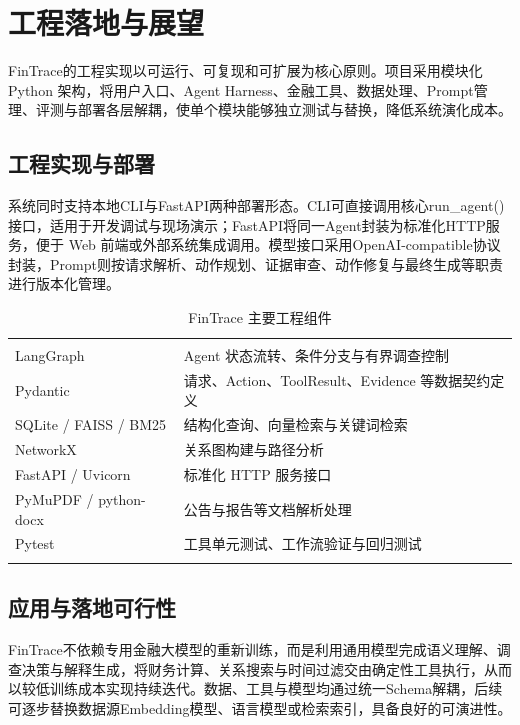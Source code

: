 \section{工程落地与展望}
\label{sec:deployment_outlook}

FinTrace的工程实现以可运行、可复现和可扩展为核心原则。项目采用模块化 Python 架构，将用户入口、Agent Harness、金融工具、数据处理、Prompt管理、评测与部署各层解耦，使单个模块能够独立测试与替换，降低系统演化成本。

\subsection{工程实现与部署}

系统同时支持本地CLI与FastAPI两种部署形态。CLI可直接调用核心run\_agent()接口，适用于开发调试与现场演示；FastAPI将同一Agent封装为标准化HTTP服务，便于 Web 前端或外部系统集成调用。模型接口采用OpenAI-compatible协议封装，Prompt则按请求解析、动作规划、证据审查、动作修复与最终生成等职责进行版本化管理。

\begin{table}[htbp]
  \centering
  \caption{FinTrace 主要工程组件}
  \label{tab:engineering_stack}
  \begin{tabular}{C{.23\textwidth}C{.67\textwidth}}
    \fintracetoprule
     &  \\
    \fintracemidrule
    LangGraph & Agent 状态流转、条件分支与有界调查控制 \\
    Pydantic & 请求、Action、ToolResult、Evidence 等数据契约定义 \\
    SQLite / FAISS / BM25 & 结构化查询、向量检索与关键词检索 \\
    NetworkX & 关系图构建与路径分析 \\
    FastAPI / Uvicorn & 标准化 HTTP 服务接口 \\
    PyMuPDF / python-docx & 公告与报告等文档解析处理 \\
    Pytest & 工具单元测试、工作流验证与回归测试 \\
    \fintracebottomrule
  \end{tabular}
\end{table}

\subsection{应用与落地可行性}

FinTrace不依赖专用金融大模型的重新训练，而是利用通用模型完成语义理解、调查决策与解释生成，将财务计算、关系搜索与时间过滤交由确定性工具执行，从而以较低训练成本实现持续迭代。数据、工具与模型均通过统一Schema解耦，后续可逐步替换数据源Embedding模型、语言模型或检索索引，具备良好的可演进性。

